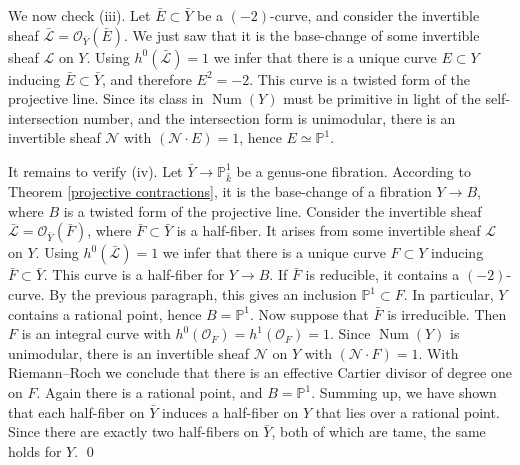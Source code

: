 \documentclass[oneside, 12pt]{amsart}
\theoremstyle{definition}
\theoremstyle{remark}
\newcommand{\ZZ}{\mathbb{Z}}
\newcommand{\FF}{\mathbb{F}}
\newcommand{\PP}{\mathbb{P}}
\newcommand{\shN}{\mathscr{N}}
\newcommand{\shL}{\mathscr{L}}
\newcommand{\foY}{\mathfrak{Y}}
\newcommand{\Br}{\operatorname{Br}}
\newcommand{\maxid}{\mathfrak{m}}
\newcommand{\Num}{\operatorname{Num}}
\renewcommand{\O}{\mathscr{O}}
\newcommand{\Pic}{\operatorname{Pic}}
\newcommand{\ra}{\rightarrow}
\newcommand{\bY}{{\bar{Y}}}
\newcommand{\bE}{{\bar{E}}}
\begin{document}

We now check (iii).  Let $\bE\subset\bY$ be a $(-2)$-curve, and consider the invertible sheaf $\bar{\shL}=\O_{\bY}(\bE)$.
We just saw that it is  the base-change of some invertible sheaf $\shL$ on $Y$.
Using $h^0(\bar{\shL})=1$ we infer that there is a unique curve $E\subset Y$ inducing $\bE\subset\bY$, and therefore $E^2=-2$.
This curve is  a twisted form of the projective line. Since its class in $\Num(Y)$ must be primitive in light of the self-intersection number,
and  the intersection form is unimodular,   there
is an invertible sheaf $\shN$ with $(\shN\cdot E)=1$, hence $E\simeq \PP^1$.

It remains to verify (iv). 
Let $\bY\ra\PP^1_{\bar{k}}$ be a genus-one fibration.
According to Theorem \ref{projective contractions}, it is the base-change of a fibration $Y\ra B$, where $B$ is a twisted form
of the projective line.  Consider the invertible sheaf  $\bar{\shL}=\O_\bY(\bar{F})$, where $\bar{F}\subset\bY$
is a half-fiber. It arises from some invertible sheaf $\shL$ on $Y$.   Using $h^0(\bar{\shL})=1$ we infer that there is a unique curve
$F\subset Y$ inducing $\bar{F}\subset \bY$. This curve is a half-fiber for $Y\ra B$. 
If $\bar{F}$ is reducible, it contains a $(-2)$-curve. By the previous paragraph, this gives an inclusion $\PP^1\subset F$.
In particular, $Y$ contains a rational point, hence $B=\PP^1$. Now suppose that $\bar{F}$ is irreducible.
Then $F$ is an integral curve with $h^0(\O_F)=h^1(\O_F)=1$. Since $\Num(Y)$ is unimodular, there
is an invertible sheaf $\shN$ on $Y$ with $(\shN\cdot F)=1$. With Riemann--Roch we conclude that there
is an effective Cartier divisor of degree one on $F$. Again there is a rational point, and $B=\PP^1$.
Summing up, we have shown that each half-fiber on $\bY$ induces a half-fiber on $Y$ that lies over a rational point.
Since there are exactly two half-fibers on $\bY$, both of which are tame, the same holds for $Y$. 
\qed

\end{document}
